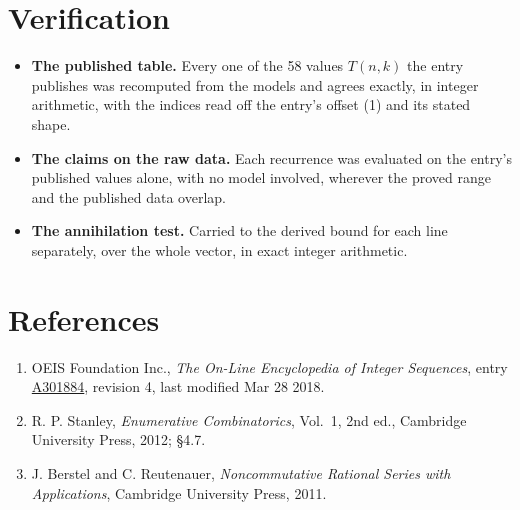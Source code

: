 \documentclass[11pt]{article}
\theoremstyle{definition}
\begin{document}
\section{Verification}

\begin{itemize}

\item {\bfseries The published table.} Every one of the 58 values $T(n,k)$ the entry publishes was recomputed from the models and agrees exactly, in integer arithmetic, with the indices read off the entry's offset (1) and its stated shape.

\item {\bfseries The claims on the raw data.} Each recurrence was evaluated on the entry's published values alone, with no model involved, wherever the proved range and the published data overlap.

\item {\bfseries The annihilation test.} Carried to the derived bound for each line separately, over the whole vector, in exact integer arithmetic.

\end{itemize}

\section{References}

\begin{enumerate}

\item OEIS Foundation Inc., \emph{The On-Line Encyclopedia of Integer Sequences}, entry \href{https://oeis.org/A301884}{A301884}, revision 4, last modified Mar 28 2018.

\item R. P. Stanley, \emph{Enumerative Combinatorics}, Vol.~1, 2nd ed., Cambridge University Press, 2012; \S4.7.

\item J. Berstel and C. Reutenauer, \emph{Noncommutative Rational Series with Applications}, Cambridge University Press, 2011.

\end{enumerate}
\end{document}
